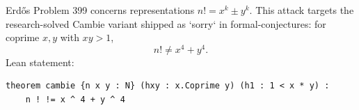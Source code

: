 Erdős Problem 399 concerns representations $n! = x^k \pm y^k$. This attack targets the
research-solved Cambie variant shipped as `sorry` in formal-conjectures: for coprime
$x, y$ with $xy > 1$,
\[
n! \ne x^4 + y^4 .
\]
Lean statement:
\begin{verbatim}
theorem cambie {n x y : N} (hxy : x.Coprime y) (h1 : 1 < x * y) :
    n ! != x ^ 4 + y ^ 4
\end{verbatim}
